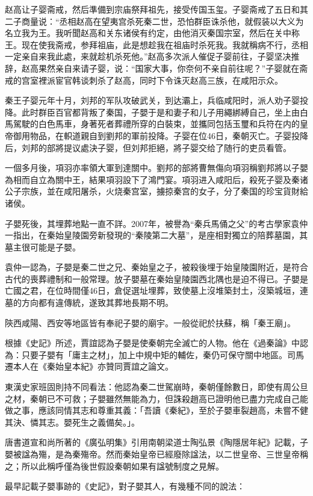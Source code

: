 赵高让子婴斋戒，然后準備到宗庙祭拜祖先，接受传国玉玺。子婴斋戒了五日和其二子商量说：“丞相赵高在望夷宫杀死秦二世，恐怕群臣诛杀他，就假装以大义为名立我为王。我听聞赵高和关东诸侯有约定，由他消灭秦国宗室，然后在关中称王。现在使我斋戒，参拜祖庙，此是想趁我在祖庙时杀死我。我就稱病不行，丞相一定亲自来我此處，来就趁机杀死他。”赵高多次派人催促子婴前往，子婴坚决推辞，赵高果然亲自来请子婴，说：“国家大事，你奈何不亲自前往呢？”子婴就在斋戒的宫室裡派宦官韩谈刺杀了赵高，同时下令诛灭赵高三族，在咸阳示众。

秦王子婴元年十月，刘邦的军队攻破武关，到达灞上，兵临咸阳时，派人劝子婴投降。此时群臣百官都背叛了秦国，子嬰于是和妻子和儿子用繩綁縛自己，坐上由白馬駕駛的白色馬車，身著死者葬禮所穿的白裝束，並攜同包括玉璽和兵符在内的皇帝御用物品，在軹道親自到劉邦的軍前投降。子婴在位46日，秦朝灭亡。子婴投降后，刘邦的部將提议處決子婴，但刘邦拒絕，將子婴交给了随行的吏员看管。

一個多月後，項羽亦率領大軍到達關中。劉邦的部將曹無傷向項羽稱劉邦將以子嬰為相而自立為關中王，結果項羽設下了鴻門宴。項羽进入咸阳后，殺死子婴及秦诸公子宗族，並在咸阳屠杀，火烧秦宫室，擄掠秦宫的女子，分了秦国的珍宝貨財給诸侯。

子嬰死後，其埋葬地點一直不詳。2007年，被譽為“秦兵馬俑之父”的考古學家袁仲一指出，在秦始皇陵園旁新發現的“秦陵第二大墓”，是座相對獨立的陪葬墓園，其墓主很可能是子嬰。

袁仲一認為，子嬰是秦二世之兄、秦始皇之子，被殺後埋于始皇陵園附近，是符合古代的喪葬禮制和一般常理。放子嬰墓在秦始皇陵園西北隅也是迫不得已。子嬰是亡國之君，在位時間僅46日，倉促選址埋葬，致使墓上沒堆築封土，沒築城垣，連墓的方向都有違傳統，遂致其葬地長期不明。

陝西咸陽、西安等地區皆有奉祀子嬰的廟宇。一般從祀於扶蘇，稱「秦王廟」。

根據《史記》所述，賈誼認為子嬰是使秦朝完全滅亡的人物。他在《過秦論》中認為：只要子嬰有「庸主之材」，加上中規中矩的輔佐，秦仍可保守關中地區。司馬遷本人在《秦始皇本紀》亦贊同賈誼之論文。

東漢史家班固則持不同看法：他認為秦二世駕崩時，秦朝僅餘數日，即使有周公旦之材，秦朝已不可救；子嬰雖然無能為力，但誅殺趙高已證明他已盡力完成自己能做之事，應該同情其志和尊重其義：「吾讀《秦紀》，至於子嬰車裂趙高，未嘗不健其決、憐其志。嬰死生之義備矣。」。

唐書道宣和尚所著的《廣弘明集》引用南朝梁道士陶弘景《陶隱居年紀》記載，子嬰被諡為殤，是為秦殤帝。然而秦始皇帝已經廢除諡法，以二世皇帝、三世皇帝稱之；所以此稱呼僅為後世假設秦朝如果有諡號制度之見解。

最早記載子嬰事跡的《史記》，對子嬰其人，有幾種不同的說法：


